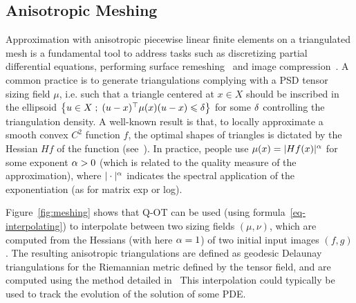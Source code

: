 

\subsection{Anisotropic Meshing}

Approximation with anisotropic piecewise linear finite elements on a triangulated mesh is a fundamental tool to address tasks such as discretizing partial differential equations, performing surface remeshing~\cite{alliez2003anisotropic} and image compression~\cite{demaret2006image}.
%
A common practice is to generate triangulations complying with a PSD tensor sizing field $\mu$, i.e. such that a triangle centered at $x \in X$ should be inscribed in the ellipsoid $\left\{ u \in X \;;\; (u-x)^\top \mu(x) (u-x) \leqslant \delta  \right\}$ for some $\delta$ controlling the triangulation density. 
%
A well-known result is that, to locally approximate a smooth convex $C^2$ function $f$,  the optimal shapes of triangles is dictated by the Hessian $H f$ of the function (see~\cite{shewchuk2002good}). In practice, people use $\mu(x) = |H f(x)|^\alpha$ for some exponent $\alpha > 0$ (which is related to the quality measure of the approximation), where $|\cdot|^\alpha$ indicates the spectral application of the exponentiation (as for matrix exp or log).

Figure~\eqref{fig:meshing} shows that Q-OT can be used (using formula~\eqref{eq-interpolating}) to interpolate between two sizing fields $(\mu,\nu)$, which are computed from the Hessians (with here $\alpha=1$) of two initial input images $(f,g)$.
%
The resulting anisotropic triangulations are defined as geodesic Delaunay triangulations for the Riemannian metric defined by the tensor field, and are computed using the method detailed in~\cite{peyre-iccv-09}
%
This interpolation could typically be used to track the evolution of the solution of some PDE. 

